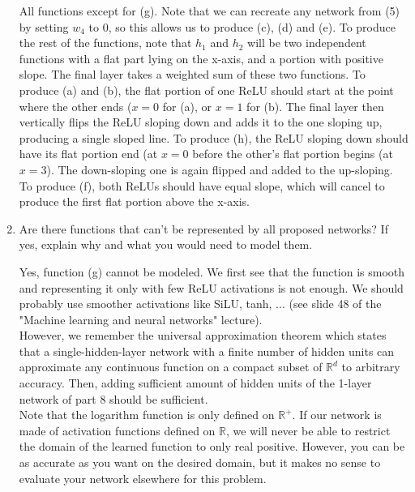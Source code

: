 \documentclass[11pt, a4paper]{article}
\begin{document}
\begin{enumerate}
    \begin{solution}
        All functions except for (g). Note that we can recreate any network from (5) by setting $w_4$ to 0, so this allows us to produce (c), (d) and (e). To produce the rest of the functions, note that $h_1$ and $h_2$ will be two independent functions with a flat part lying on the x-axis, and a portion with positive slope. The final layer takes a weighted sum of these two functions. To produce (a) and (b), the flat portion of one ReLU should start at the point where the other ends ($x = 0$ for (a), or $x = 1$ for (b). The final layer then vertically flips the ReLU sloping down and adds it to the one sloping up, producing a single sloped line. To produce (h), the ReLU sloping down should have its flat portion end (at $x = 0$ before the other’s flat portion begins (at $x = 3$). The down-sloping one is again flipped and added to the up-sloping. To produce (f), both ReLUs should have equal slope, which will cancel to produce the first flat portion above the x-axis.
    \end{solution}

    \item Are there functions that can't be represented by all proposed networks? If yes, explain why and what you would need to model them.
    
    \begin{solution}
        Yes, function (g) cannot be modeled. We first see that the function is smooth and representing it only with few ReLU activations is not enough. We should probably use smoother activations like SiLU, tanh, ... (see slide 48 of the "Machine learning and neural networks" lecture).\\
        
        However, we remember the universal approximation theorem which states that a single-hidden-layer network with a finite number of hidden units can approximate any continuous function on a compact subset of $\mathbb{R}^d$ to arbitrary accuracy. Then, adding sufficient amount of hidden units of the 1-layer network of part 8 should be sufficient.\\

        Note that the logarithm function is only defined on $\mathbb{R}^+$. If our network is made of activation functions defined on $\mathbb{R}$, we will never be able to restrict the domain of the learned function to only real positive. However, you can be as accurate as you want on the desired domain, but it makes no sense to evaluate your network elsewhere for this problem.
    \end{solution}
\end{enumerate}
\end{document}
